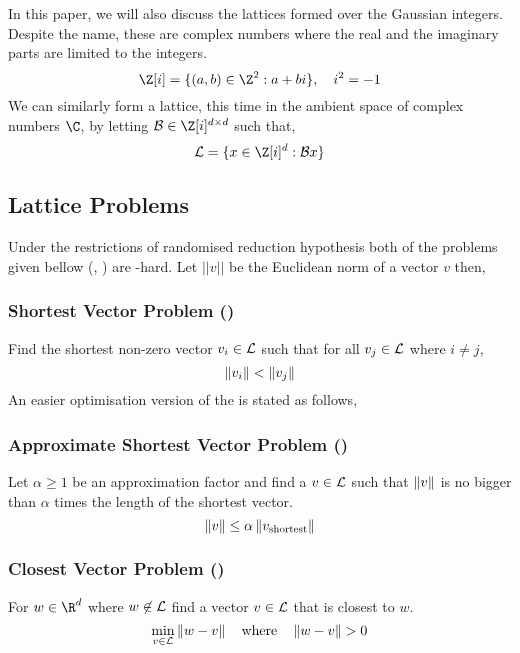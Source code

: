 \documentclass{homework}
\begin{document}

In this paper, we will also discuss the lattices formed over the
Gaussian integers. Despite the name, these are complex numbers where
the real and the imaginary parts are limited to the integers.
\[
  \G = \{(a,b)\in \Z^2: a + bi\}, \quad i^2 = -1
\]
We can similarly form a lattice, this time in the ambient space of
complex numbers $\C$, by letting $\B \in \G^{d \times d}$ such that,
\[
  \L = \{x \in \G^d : \B x\}
\]


\subsection{Lattice Problems}

Under the restrictions of randomised reduction hypothesis
\cite{ajtai1998shortest} both of the problems given bellow (\SVP,
\CVP) are \NP-hard. Let $||v||$ be the Euclidean norm of a vector $v$
then,

\subsubsection{Shortest Vector Problem (\SVP)} Find the shortest
non-zero vector $v_i \in \mathcal{L}$ such that for all $v_j \in \mathcal{L}$ where
$i \neq j$,
\[
  \left\lVert v_i\right\rVert < \left\lVert v_j\right\rVert
\]
An easier optimisation version of the \SVP{} is stated as follows,
\subsubsection{Approximate Shortest Vector Problem (\appr\SVP)} Let
$\alpha \geq 1$ be an approximation factor and find a $v \in \mathcal{L}$ such
that $\left\lVert v\right\rVert$ is no bigger than $\alpha$ times the length of the
shortest vector.
\[
  \left\lVert v\right\rVert \leq \alpha\left\lVert v_\text{shortest}\right\rVert
\]
\subsubsection{Closest Vector Problem (\CVP)} For $w \in \R^d$ where
$w \not\in \mathcal{L}$ find a vector $v \in \mathcal{L}$ that is closest to $w$.
\[
  \min_{v \in \mathcal{L}} \left\lVert w - v\right\rVert\quad\text{where}\quad \left\lVert w - v\right\rVert > 0
\]
\end{document}
